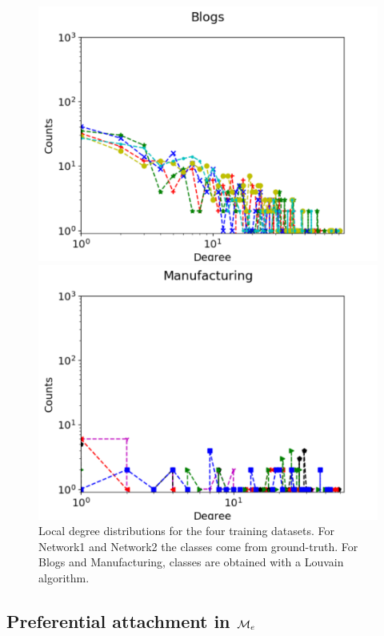 \begin{figure}[h]
\begin{minipage}{0.4\textwidth}
            \includegraphics[width=\textwidth]{img/corpus/blogs_1}
        \end{minipage}
        \begin{minipage}{0.4\textwidth}
            \includegraphics[width=\textwidth]{img/corpus/manufacturing_1}
        \end{minipage}
        \caption {Local degree distributions for the four training datasets. For Network1 and Network2 the classes come from ground-truth. For Blogs and Manufacturing, classes are obtained with a Louvain algorithm.} 
	\label{fig:synt_graph_local}
\end{figure}



\subsection{Preferential attachment in $\mathcal{M}_e$}

